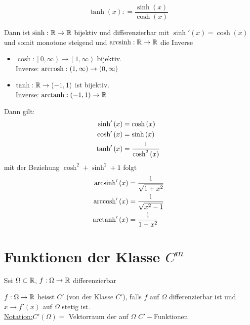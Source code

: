 \begin{enumerate}
\begin{multicols}{2}
\null\vfill
\[\tanh \left( x \right): = \frac{{\sinh \left( x \right)}}{{\cosh \left( x \right)}}\]
\null\vfill
\columnbreak
{}
\end{multicols}

Dann ist $\sinh:\mathbb{R}\to\mathbb{R}$ bijektiv und differenzierbar mit $\sinh'(x)=\cosh(x)$ und somit monotone steigend und $\operatorname{arcsinh}:\mathbb{R}\to\mathbb{R}$ die Inverse
\begin{itemize}
\item $\cosh :\left[ {0,\infty } \right) \to \left[ {1,\infty } \right)$ bijektiv.\\
Inverse: $\operatorname{arccosh}:\left( 1,\infty\right)\to\left( 0,\infty\right)$
\item $\tanh :\mathbb{R} \to \left( {-1,1 } \right)$ ist bijektiv.\\
Inverse: $\operatorname{arctanh}:\left( -1,1\right)\to\mathbb{R}$
\end{itemize}
Dann gilt:
\begin{align*}
{\mathop{\rm sinh'}\nolimits} \left( x \right) &= \cosh \left( x \right)\\
{\mathop{\rm cosh'}\nolimits} \left( x \right) &= \sinh \left( x \right)\\
{\mathop{\rm tanh'}\nolimits} \left( x \right) &= \frac{1}{{{{\cosh }^2}\left( x \right)}}
\end{align*}
mit der Beziehung $\cosh^2+\sinh^2+1$ folgt
\begin{align*}
\operatorname{arcsinh}'\left( x \right) &= \frac{1}{{\sqrt {1 + {x^2}} }}\\
\operatorname{arccosh}'\left( x \right) &= \frac{1}{{\sqrt {{x^2} - 1} }}\\
\operatorname{arctanh}'\left( x \right) &= \frac{1}{{1 - {x^2}}}
\end{align*}
\end{enumerate}

\section{Funktionen der Klasse $C^m$}
Sei $\Omega\subset\mathbb{R}$, $f:\Omega\to\mathbb{R}$ differenzierbar
\begin{definition}{5.23}
$f:\Omega\to\mathbb{R}$ heisst $C'$ (von der Klasse $C'$), falls $f$ auf $\Omega$ differenzierbar ist und $x\to f'(x)$ auf $\Omega$ stetig ist.\\

\noindent\underline{Notation:}$C'\left( \Omega\right)=$ Vektorraum der auf $\Omega$ $C'-$Funktionen
\end{definition}

